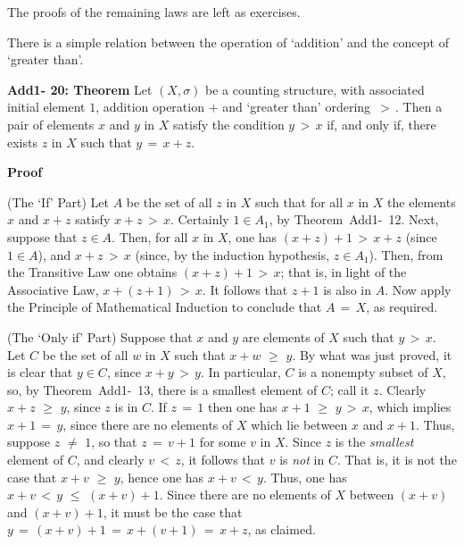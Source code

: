 \V

        The proofs of the remaining laws are left as exercises.


\V
\V

        There is a simple relation between the operation of `addition' and the concept of `greater than'.

\V

        {\bf Add1- 20: Theorem} Let $(X,{\sigma})$ be a counting structure, with associated initial element $1$,
    addition operation $+$ and `greater than' ordering $\,>\,$.
    Then a pair of elements $x$ and $y$ in $X$ satisfy the condition $y\,>\,x$ if, and only if, there exists $z$ in $X$ such that $y \,=\, x+z$.

\V

        {\bf Proof}  

\V

        (The `If' Part) Let $A$ be the set of all $z$ in $X$ such that for all $x$ in $X$ the elements $x$ and $x+z$ satisfy $x+z\,>\,x$.
    Certainly $1{\in}A_{1}$,  by Theorem~Add1-~12.
    Next, suppose that $z{\in}A$.
    Then, for all $x$ in $X$, one has $(x+z)+1\,>\,x+z$ (since $1{\in}A$), and $x+z\,>\,x$ (since, by the induction hypothesis, $z{\in}A_{1}$).
    Then, from the Transitive Law one obtains $(x+z)+1\,>\,x$; that is, in light of the Associative Law, $x+(z+1)\,>\,x$.
    It follows that $z+1$ is also in $A$.
    Now apply the Principle of Mathematical Induction to conclude that $A \,=\, X$, as required.

\V

        (The `Only if' Part) Suppose that $x$ and $y$ are elements of $X$ such that $y\,>\,x$.
    Let $C$ be the set of all $w$ in $X$ such that $x+w\,\,{\geq}\,\,y$.
    By what was just proved, it is clear that $y{\in}C$, since $x+y\,>\,y$.
    In particular, $C$ is a nonempty subset of $X$, so, by Theorem~Add1-~13, there is a smallest element of $C$; call it $z$.
    Clearly $x+z\,\,{\geq}\,\,y$, since $z$ is in $C$. If $z \,=\, 1$ then one has $x+1\,\,{\geq}\,\,y\,>\,x$,
    which implies $x+1 \,=\, y$, since there  are no elements of $X$ which lie between $x$ and $x+1$.
    Thus, suppose $z \,\,{\neq}\,\, 1$, so that $z \,=\, v+1$ for some $v$ in $X$.
    Since $z$ is the {\em smallest} element of $C$, and clearly $v\,<\,z$, it follows that $v$ is {\em not} in $C$.
    That is, it is not the case that $x+v\,\,{\geq}\,\,y$, hence one has $x+v\,<\,y$.
    Thus, one has $x+v\,<\,y\,\,{\leq}\,\,(x+v)+1$. Since there are no elements of $X$ between $(x+v)$ and $(x+v)+1$,
    it must be the case that $y \,=\, (x+v)+1 \,=\, x+(v+1) \,=\, x+z$, as claimed.

